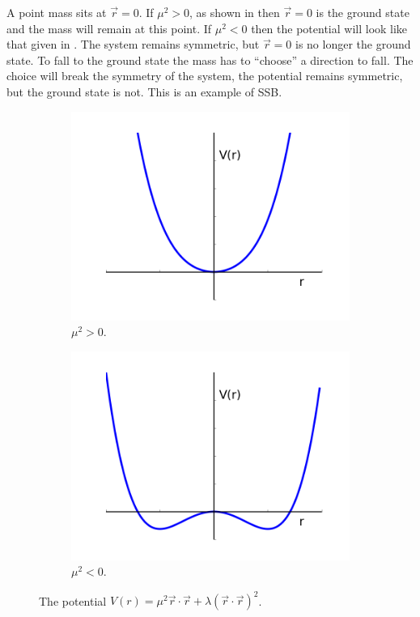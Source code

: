 A point mass sits at $\vec{r}=0$. If $\mu^{2}>0$, as shown in
 then $\vec{r}=0$ is the ground state and
the mass will remain at this point.
If $\mu^{2}<0$ then the potential will look like that given in
. The system remains symmetric, but $\vec{r}=0$ is no longer
the ground state. To fall to the ground state the mass has to ``choose'' a
direction to fall. The choice will break the symmetry of the system, the
potential remains symmetric, but the ground state is not. This is an example of
\ac{SSB}.

\begin{figure}[htbp]
  \centering
  \begin{subfigure}{0.45\textwidth}
    \centering
    \includegraphics[width=\textwidth]{higgs_pot_mup}
    \caption{$\mu^{2}>0$.}
    \label{fig:higgs_pot_mup}
  \end{subfigure}
  \begin{subfigure}{0.45\textwidth}
    \centering
    \includegraphics[width=\textwidth]{higgs_pot_mum}
    \caption{$\mu^{2}<0$.}
    \label{fig:higgs_pot_mum}
  \end{subfigure}
  \caption{The potential $ V(r) = \mu^{2} \vec{r} \cdot \vec{r} + \lambda (
\vec{r} \cdot \vec{r} )^{2}$.}
  \label{fig:higgs_pot}
\end{figure}

